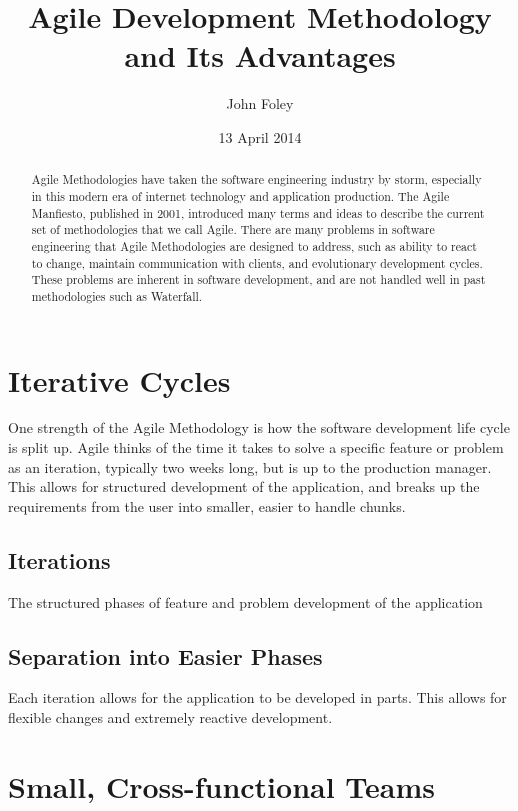 \documentclass[11pt]{article}
\title{Agile Development Methodology and Its Advantages}
\author{John Foley}
\date{13 April 2014}
\begin{document}
\maketitle

\thispagestyle{empty}

\begin{abstract}
  Agile Methodologies have taken the software engineering industry by storm, especially in this modern
era of internet technology and application production. The Agile Manfiesto, published in 2001,
 introduced many terms and ideas to describe the current set of methodologies that we call Agile. There are many
 problems in software engineering that Agile Methodologies are designed to address, such as ability to react to 
 change, maintain communication with clients, and evolutionary development cycles. These problems are inherent
 in software development, and are not handled well in past methodologies such as Waterfall. 
\end{abstract}

\section{Iterative Cycles}

One strength of the Agile Methodology is how the software development life cycle is split up. Agile thinks
of the time it takes to solve a specific feature or problem as an iteration, typically two weeks long, but
is up to the production manager. This allows for structured development of the application, and breaks
up the requirements from the user into smaller, easier to handle chunks. 

\subsection{Iterations} 
The structured phases of feature and problem development of the application

\subsection{Separation into Easier Phases} 
Each iteration allows for the application to be developed in parts. This allows for flexible changes and
extremely reactive development.~\cite{Cao:2010:MDA:1877725.1877730}

\section{Small, Cross-functional Teams}
\end{document}
